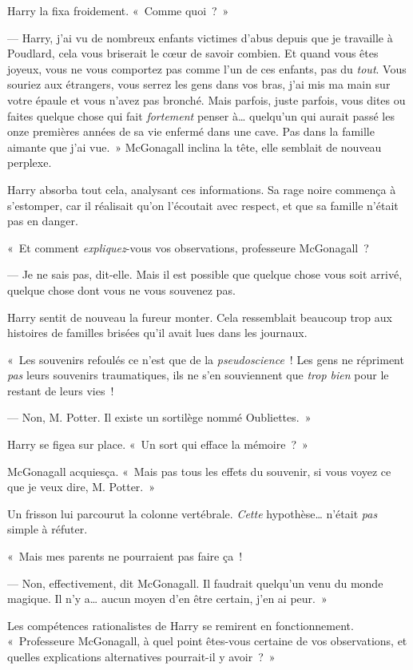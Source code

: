 Harry la fixa froidement. «~Comme quoi~?~»

--- Harry, j'ai vu de nombreux enfants victimes d'abus depuis que je travaille à Poudlard, cela vous briserait le cœur de savoir combien.
Et quand vous êtes joyeux, vous ne vous comportez pas comme l'un de ces enfants, pas du \emph{tout}.
Vous souriez aux étrangers, vous serrez les gens dans vos bras, j'ai mis ma main sur votre épaule et vous n'avez pas bronché.
Mais parfois, juste parfois, vous dites ou faites quelque chose qui fait \emph{fortement} penser à…
quelqu'un qui aurait passé les onze premières années de sa vie enfermé dans une cave.
Pas dans la famille aimante que j'ai vue.~»
McGonagall inclina la tête, elle semblait de nouveau perplexe.

Harry absorba tout cela, analysant ces informations. Sa rage noire commença à s'estomper, car il réalisait qu'on l'écoutait avec respect, et que sa famille n'était pas en danger.

«~Et comment \emph{expliquez}-vous vos observations, professeure McGonagall~?

--- Je ne sais pas, dit-elle. Mais il est possible que quelque chose vous soit arrivé, quelque chose dont vous ne vous souvenez pas.

Harry sentit de nouveau la fureur monter. Cela ressemblait beaucoup trop aux histoires de familles brisées qu'il avait lues dans les journaux.

«~Les souvenirs refoulés ce n'est que de la \emph{pseudoscience}~!
Les gens ne répriment \emph{pas} leurs souvenirs traumatiques, ils ne s'en souviennent que \emph{trop bien} pour le restant de leurs vies~!

--- Non, M. Potter. Il existe un sortilège nommé Oubliettes.~»

Harry se figea sur place. «~Un sort qui efface la mémoire~?~»

McGonagall acquiesça. «~Mais pas tous les effets du souvenir, si vous voyez ce que je veux dire, M. Potter.~»

Un frisson lui parcourut la colonne vertébrale. \emph{Cette} hypothèse… n'était \emph{pas} simple à réfuter.

«~Mais mes parents ne pourraient pas faire ça~!

--- Non, effectivement, dit McGonagall. Il faudrait quelqu'un venu du monde magique. Il n'y a… aucun moyen d'en être certain, j'en ai peur.~»

Les compétences rationalistes de Harry se remirent en fonctionnement. «~Professeure McGonagall, à quel point êtes-vous certaine de vos observations, et quelles explications alternatives pourrait-il y avoir~?~»


